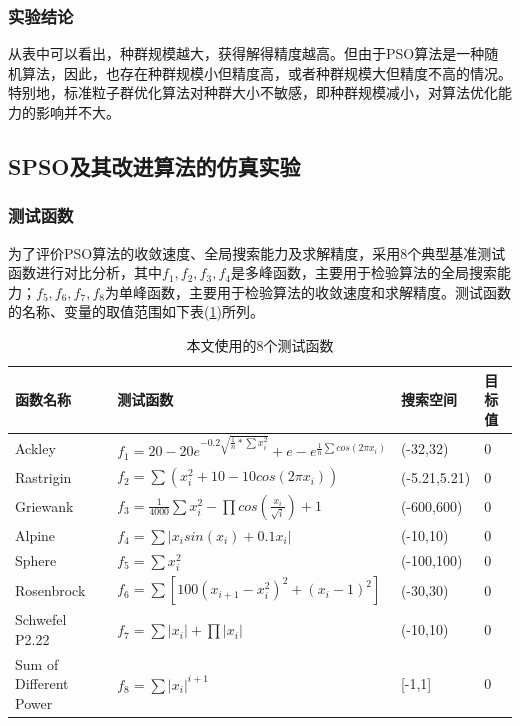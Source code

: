\subsubsection{实验结论}
从表中可以看出，种群规模越大，获得解得精度越高。但由于PSO算法是一种随机算法，因此，也存在种群规模小但精度高，或者种群规模大但精度不高的情况。特别地，标准粒子群优化算法对种群大小不敏感，即种群规模减小，对算法优化能力的影响并不大。
\subsection{SPSO及其改进算法的仿真实验}
\subsubsection{测试函数}
为了评价PSO算法的收敛速度、全局搜索能力及求解精度，采用8个典型基准测试函数进行对比分析，其中$f_1,f_2,f_3,f_4$是多峰函数，主要用于检验算法的全局搜索能力；$f_5,f_6,f_7,f_8$为单峰函数，主要用于检验算法的收敛速度和求解精度。测试函数的名称、变量的取值范围如下表(\ref{tabfunction1})所列。


\begin{table}[htbp]
	\renewcommand\arraystretch{1.2}

	\centering
	\caption{本文使用的8个测试函数}
	\label{tabfunction1}
	\begin{tabular}{p{4cm}<{\centering}p{7.5cm}<{\centering}p{2cm}<{\centering}p{1.5cm}<{\centering}}
		\toprule[1.5pt]
		\textbf{函数名称}  & \textbf{测试函数} &\textbf{搜索空间}  &  \textbf{目标值}\\
		\midrule[1pt]
		Ackley & $f_1=20-20e^{-0.2\sqrt{\frac{1}{n}*\sum x_i^2}}+e-e^{\frac{1}{n}\sum cos(2\pi x_i)} $   &  (-32,32)  &  0\\
		Rastrigin & $f_2=\sum (x_i^2+10-10cos(2\pi x_i))$  &  (-5.21,5.21)  &  0  \\
		Griewank & $ f_3=\frac{1}{4000}\sum x_i^2-\prod cos(\frac{x_i}{\sqrt{i}})+1 $  &  (-600,600)  &  0 \\
		Alpine & $ f_4=\sum |x_isin(x_i)+0.1x_i| $  &  (-10,10)  &  0  \\
		Sphere & $ f_5=\sum x_i^2 $  &(-100,100)  &  0  \\
		Rosenbrock & $ f_6=\sum [100(x_{i+1}-x_i^2)^2+(x_i-1)^2] $  &  (-30,30)  &  0  \\
		Schwefel P2.22 & $ f_7=\sum |x_i|+\prod |x_i| $  &  (-10,10)  &  0 \\
		Sum of Different Power & $ f_8=\sum |x_i|^{i+1} $ &  [-1,1]  &  0 \\
		\bottomrule[1.5pt]
	\end{tabular}%
\end{table}%

